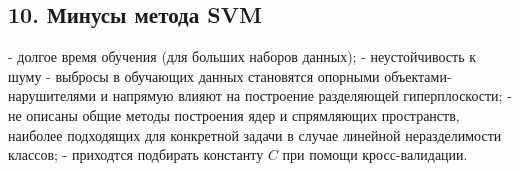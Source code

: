 \subsection{10. Минусы метода SVM}

- долгое время обучения (для больших наборов данных);
- неустойчивость к шуму - выбросы в обучающих данных становятся опорными
объектами-нарушителями и напрямую влияют на построение разделяющей
гиперплоскости;
- не описаны общие методы построения ядер и спрямляющих пространств,
наиболее подходящих для конкретной задачи в случае линейной неразделимости
классов;
- приходтся подбирать константу $C$ при помощи кросс-валидации.